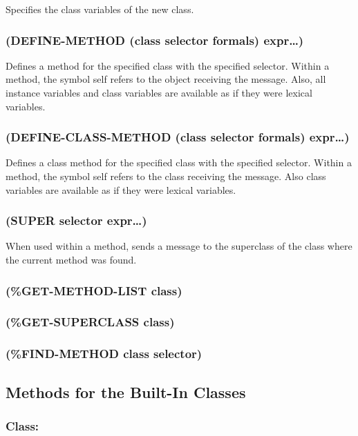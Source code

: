 \documentclass[11pt]{article}
\begin{document}
Specifies the class variables of the new class.
\subsubsection{(DEFINE-METHOD (class selector formals) expr\ldots{})}
\label{sec-4-11-2}

Defines a method for the specified class with the specified selector.
Within a method, the symbol self refers to the object receiving the
message.  Also, all instance variables and class variables are
available as if they were lexical variables.
\subsubsection{(DEFINE-CLASS-METHOD (class selector formals) expr\ldots{})}
\label{sec-4-11-3}

Defines a class method for the specified class with the specified
selector.  Within a method, the symbol self refers to the class
receiving the message.  Also class variables are available as if they
were lexical variables.
\subsubsection{(SUPER selector expr\ldots{})}
\label{sec-4-11-4}

When used within a method, sends a message to the superclass of the
class where the current method was found.
\subsubsection{(\%GET-METHOD-LIST class)}
\label{sec-4-11-5}

\subsubsection{(\%GET-SUPERCLASS class)}
\label{sec-4-11-6}

\subsubsection{(\%FIND-METHOD class selector)}
\label{sec-4-11-7}
\subsection{Methods for the Built-In Classes}
\label{sec-4-12}

\subsubsection{Class:}
\label{sec-4-12-1}
\end{document}
